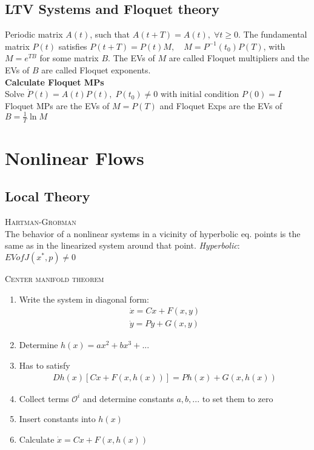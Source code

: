 \subsection{LTV Systems and Floquet theory}
Periodic matrix $A(t)$, such that $A(t+T)=A(t), \; \forall t \geq 0$. The fundamental matrix $P(t)$ satisfies $P(t+T)=P(t)M, \quad M=P^{-1}(t_0)P(T)$, with $M=e^{TB}$ for some matrix $B$. The EVs of $M$ are called Floquet multipliers and the EVs of $B$ are called Floquet exponents.\\
\textbf{Calculate Floquet MPs}\\
Solve $\dot{P}(t)=A(t)P(t), \; P(t_0)\neq 0$ with initial condition $P(0)=I$\\
Floquet MPs are the EVs of $M=P(T)$ and Floquet Exps are the EVs of $B=\frac{1}{T}\ln M$

\section{Nonlinear Flows}
\subsection{Local Theory}
\textsc{Hartman-Grobman}\\
The behavior of a nonlinear systems in a vicinity of hyperbolic eq. points is the same as in the linearized system around that point.
\emph{Hyperbolic}: $EV of J(x^*,p) \neq 0$
\vspace{0.2cm}

\textsc{Center manifold theorem}\\

\begin{enumerate}
\item Write the system in diagonal form:
\begin{align*}
\dot{x}=Cx+F(x,y)\\
\dot{y}=Py+G(x,y)
\end{align*}
\item Determine $h(x)=ax^2+bx^3+...$
\item Has to satisfy
\begin{align*}
Dh(x)[Cx+F(x,h(x))]=Ph(x)+G(x,h(x))
\end{align*}
\item Collect terms $\mathcal{O}^i$ and determine constants $a,b,...$ to set them to zero
\item Insert constants into $h(x)$
\item Calculate $\dot{x}=Cx+F(x,h(x))$
\end{enumerate}


